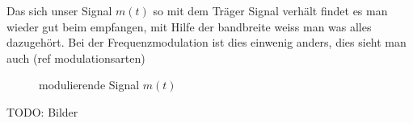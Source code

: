 Das sich unser Signal \(m(t)\)  so mit dem Träger Signal verhält findet es man wieder gut beim empfangen, mit Hilfe der bandbreite weiss man was alles dazugehört.
Bei der Frequenzmodulation ist dies einwenig anders, dies sieht man auch (ref modulationsarten)

\begin{figure}
	\centering
	
	\caption{modulierende Signal \(m(t)\)}
	\label{fig:}
\end{figure}
%
TODO:
Bilder 


%
